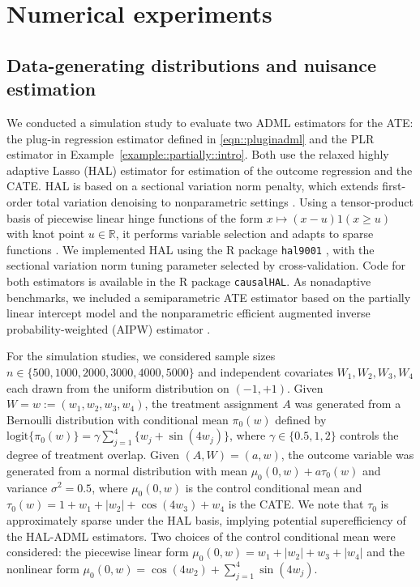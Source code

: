 \documentclass[11pt]{article}
\theoremstyle{definition}
\begin{document}
\section{Numerical experiments}

 
 
  

\subsection{Data-generating distributions and nuisance estimation}

We conducted a simulation study to evaluate two ADML estimators for the ATE: the plug-in regression estimator defined in \eqref{eqn::pluginadml} and the PLR estimator in Example~\ref{example::partially::intro}. Both use the relaxed highly adaptive Lasso (HAL) estimator \citep{vanderlaanGenerlaTMLEFIRST,HAL2016,bibautHAL} for estimation of the outcome regression and the CATE. HAL is based on a sectional variation norm penalty, which extends first-order total variation denoising to nonparametric settings \citep{geerLocalAdapt,fang2021multivariate,marswithLasso}. Using a tensor-product basis of piecewise linear hinge functions of the form \(x \mapsto (x-u)1(x \ge u)\) with knot point \(u \in \mathbb{R}\), it performs variable selection and adapts to sparse functions \citep{marswithLasso}. We implemented HAL using the R package \texttt{hal9001} \citep{hal2}, with the sectional variation norm tuning parameter selected by cross-validation. Code for both estimators is available in the R package \texttt{causalHAL}. As nonadaptive benchmarks, we included a semiparametric ATE estimator based on the partially linear intercept model \citep{robinson1988root,imbensOverlapEstimand2006} and the nonparametric efficient augmented inverse probability-weighted (AIPW) estimator \citep{robinsCausal,robins1995analysis}.


For the simulation studies, we considered sample sizes $n \in \{500, 1000, 2000, 3000, 4000, 5000\}$ and independent covariates $W_1, W_2, W_3, W_4$ each drawn from the uniform distribution on $(-1,+1)$. Given $W=w:=(w_1,w_2,w_3,w_4)$, the treatment assignment $A$ was generated from a Bernoulli distribution with conditional mean $\pi_0(w)$ defined by $\text{logit}\{\pi_0(w)\}=\gamma \sum_{j=1}^4 \{w_j + \sin(4w_j)\}$, where $\gamma \in \{0.5, 1, 2\}$ controls the degree of treatment overlap. Given $(A,W)=(a,w)$, the outcome variable was generated from a normal distribution with mean $\mu_0(0,w)+a\tau_0(w)$ and variance $\sigma^2=0.5$, where $\mu_0(0,w)$ is the control conditional mean and $\tau_0(w) = 1 + w_1 + |w_2| + \cos(4w_3) + w_4$ is the CATE. We note that $\tau_0$ is approximately sparse under the HAL basis, implying potential superefficiency of the HAL-ADML estimators. Two choices of the control conditional mean were considered: the piecewise linear form  $\mu_0(0,w) =  w_1 + |w_2|  + w_3 + |w_4|$ and the nonlinear form $\mu_0(0,w) = \cos(4w_2) + \sum_{j=1}^4\sin(4w_j)$.  
\end{document}
